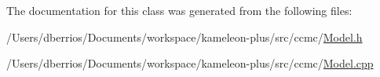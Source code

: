 The documentation for this class was generated from the following files\-:\begin{DoxyCompactItemize}
\item 
/\-Users/dberrios/\-Documents/workspace/kameleon-\/plus/src/ccmc/\hyperlink{_model_8h}{Model.\-h}\item 
/\-Users/dberrios/\-Documents/workspace/kameleon-\/plus/src/ccmc/\hyperlink{_model_8cpp}{Model.\-cpp}\end{DoxyCompactItemize}
